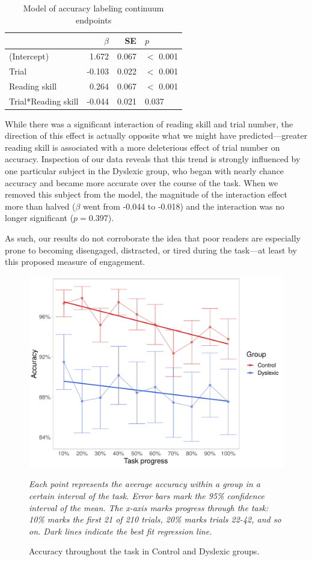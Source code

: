 \documentclass[../uwthesis.tex]{subfiles}
\begin{document}
\begin{table}
\centering
\caption{Model of accuracy labeling continuum endpoints} \label{tab:fatigue}
    \begin{tabular}{lrrl}
    \toprule
      & $\beta$ & SE & $p$\\
    \midrule
    (Intercept) & 1.672 & 0.067 & $<$ 0.001\\
    Trial & -0.103 & 0.022 & $<$ 0.001\\
    Reading skill & 0.264 & 0.067 & $<$ 0.001\\
    Trial*Reading skill & -0.044 & 0.021 & 0.037\\
    \bottomrule
    \end{tabular}
\end{table}

While there was a significant interaction of reading skill and trial number, the direction of this effect is actually opposite what we might have predicted---greater reading skill is associated with a more deleterious effect of trial number on accuracy. Inspection of our data reveals that this trend is strongly influenced by one particular subject in the Dyslexic group, who began with nearly chance accuracy and became more accurate over the course of the task. When we removed this subject from the model, the magnitude of the interaction effect more than halved ($\beta$ went from -0.044 to -0.018) and the interaction was no longer significant ($p=0.397$). 

As such, our results do not corroborate the idea that poor readers are especially prone to becoming disengaged, distracted, or tired during the task---at least by this proposed measure of engagement.

 \begin{figure}
    \centering
    \caption{Accuracy throughout the task in Control and Dyslexic groups.}
    \label{fig:recency_fx_group}
    \includegraphics[width = 10 cm]{images/paper_4/fatigue_fx_group.pdf}
    \item \textit{Each point represents the average accuracy within a group in a certain interval of the task. Error bars mark the 95\% confidence interval  of the mean. The x-axis marks progress through the task: 10\% marks the first 21 of 210 trials, 20\% marks trials 22-42, and so on. Dark lines indicate the best fit regression line.}
\end{figure}
\end{document}
